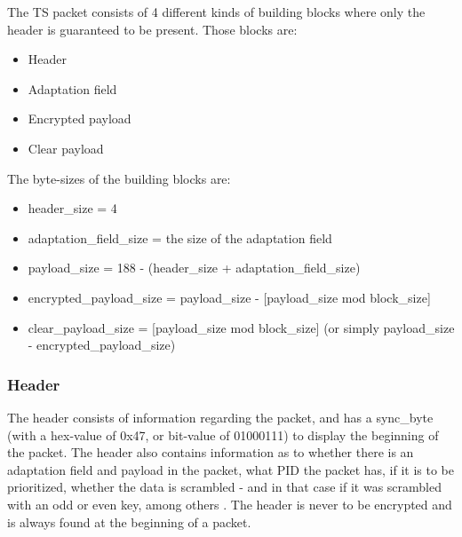 The TS packet consists of 4 different kinds of building blocks where only the 
header is guaranteed to be present. Those blocks are:

\begin{itemize}
\item Header
\item Adaptation field
\item Encrypted payload
\item Clear payload
\end{itemize}

The byte-sizes of the building blocks are:

\begin{itemize}
\item header\_size = 4
\item adaptation\_field\_size = the size of the adaptation field
\item payload\_size = 188 - (header\_size + adaptation\_field\_size)
\item encrypted\_payload\_size = payload\_size - [payload\_size mod block\_size]
\item clear\_payload\_size = [payload\_size mod block\_size] 
  (or simply payload\_size - encrypted\_payload\_size)
\end{itemize}

\subsubsection{Header}
The header consists of information regarding the packet, and has a sync\_byte 
(with a hex-value of 0x47, or bit-value of 01000111) to display the beginning of 
the packet. The header also contains information as to whether there is an 
adaptation field and payload in the packet, what PID the packet has, if it is to 
be prioritized, whether the data is scrambled - and in that case if it was 
scrambled with an odd or even key, among others \citep[pp. 25--26]{etsiMPEG:2009}
. The header is never to be encrypted and is always found at the beginning of a 
packet. \citep[pp. 10--11]{DVB:2013}

